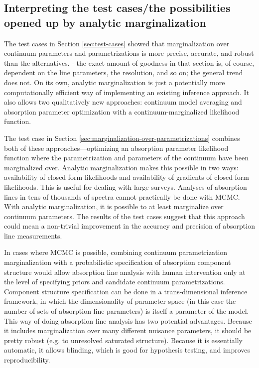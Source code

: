 \documentclass[manuscript]{aastex62}
\begin{document}
\subsection{Interpreting the test cases/the possibilities opened up by analytic marginalization}
The test cases in Section \ref{sec:test-cases} showed that marginalization over continuum parameters and parametrizations is more precise, accurate, and robust than the alternatives.
- the exact amount of goodness in that section is, of course, dependent on the line parameters, the resolution, and so on; the general trend does not.
On its own, analytic marginalization is just a potentially more computationally efficient way of implementing an existing inference approach.
It also allows two qualitatively new approaches: continuum model averaging and absorption parameter optimization with a continuum-marginalized likelihood function.

The test case in Section \ref{sec:marginalization-over-parametrizations} combines both of these approaches---optimizing an absorption parameter likelihood function where the parametrization and parameters of the continuum have been marginalized over.
Analytic marginalization makes this possible in two ways: availability of closed form likelihoods and availability of gradients of closed form likelihoods.
This is useful for dealing with large surveys.
Analyses of absorption lines in tens of thousands of spectra \citep[e.g.]{2013ApJ...770..130Z,Zasowski:2015hi} cannot practically be done with MCMC.
With analytic marginalization, it is possible to at least marginalize over continuum parameters.
The results of the test cases suggest that this approach could mean a non-trivial improvement in the accuracy and precision of absorption line measurements.

In cases where MCMC is possible, combining continuum parametrization marginalization with a probabilistic specification of absorption component structure would allow absorption line analysis with human intervention only at the level of specifying priors and candidate continuum parametrizations.
Component structure specification can be done in a trans-dimensional inference framework, in which the dimensionality of parameter space (in this case the number of sets of absorption line parameters) is itself a parameter of the model.
This way of doing absorption line analysis has two potential advantages.
Because it includes marginalization over many different nuisance parameters, it should be pretty robust (e.g. to unresolved saturated structure).
Because it is essentially automatic, it allows blinding, which is good for hypothesis testing, and improves reproducibility.
\end{document}
